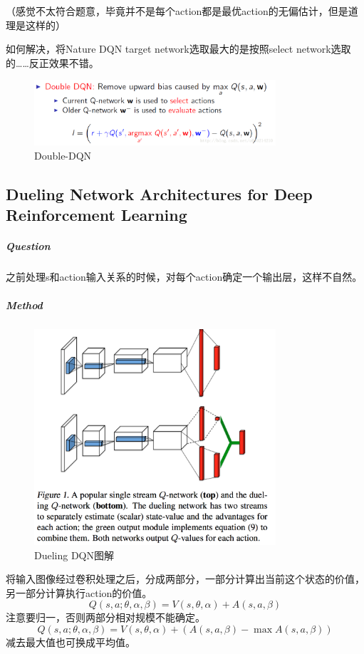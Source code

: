 \documentclass[a4paper]{article}
\begin{document}
（感觉不太符合题意，毕竟并不是每个action都是最优action的无偏估计，但是道理是这样的）

如何解决，将Nature DQN target network选取最大的是按照select network选取的……反正效果不错。
\begin{figure}
\centering
\includegraphics[width=0.8\textwidth]{./img/28.png}
\caption{Double-DQN}
\label{fig:28}
\end{figure}

\subsection{Dueling Network Architectures for Deep Reinforcement Learning\cite{DBLP:journals/corr/WangFL15}}
\subparagraph{Question}
之前处理s和action输入关系的时候，对每个action确定一个输出层，这样不自然。
\subparagraph{Method}
\begin{figure}
\centering
\includegraphics[width=0.8\textwidth]{./img/29.png}
\caption{Dueling DQN图解}
\label{fig:29}
\end{figure}将输入图像经过卷积处理之后，分成两部分，一部分计算出当前这个状态的价值，另一部分计算执行action的价值。
$$Q(s,a;\theta,\alpha,\beta)=V(s,\theta, \alpha) + A(s,a,\beta)$$
注意要归一，否则两部分相对规模不能确定。
$$Q(s,a;\theta,\alpha,\beta)=V(s,\theta, \alpha) + (A(s,a,\beta) - \max A(s,a,\beta))$$减去最大值也可换成平均值。




\end{document}
